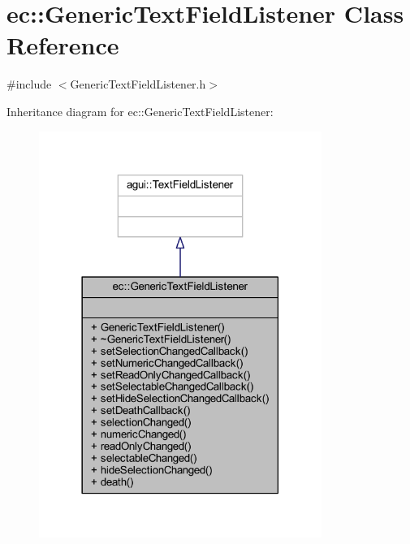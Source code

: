 \hypertarget{classec_1_1_generic_text_field_listener}{}\section{ec\+:\+:Generic\+Text\+Field\+Listener Class Reference}
\label{classec_1_1_generic_text_field_listener}


{\ttfamily \#include $<$Generic\+Text\+Field\+Listener.\+h$>$}



Inheritance diagram for ec\+:\+:Generic\+Text\+Field\+Listener\+:\nopagebreak
\begin{figure}[H]
\begin{center}
\leavevmode
\includegraphics[width=261pt]{classec_1_1_generic_text_field_listener__inherit__graph}
\end{center}
\end{figure}


